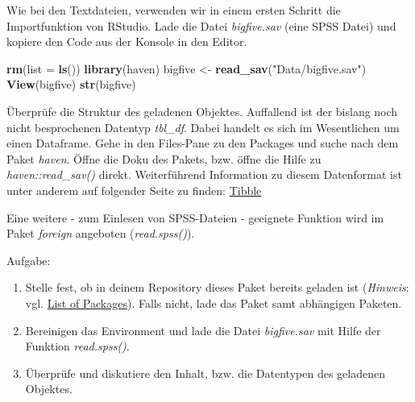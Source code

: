 \documentclass[]{article}
\newenvironment{Shaded}{\begin{snugshade}}{\end{snugshade}}
\newcommand{\KeywordTok}[1]{\textcolor[rgb]{0.13,0.29,0.53}{\textbf{#1}}}
\newcommand{\DataTypeTok}[1]{\textcolor[rgb]{0.13,0.29,0.53}{#1}}
\newcommand{\StringTok}[1]{\textcolor[rgb]{0.31,0.60,0.02}{#1}}
\newcommand{\NormalTok}[1]{#1}
\providecommand{\tightlist}{%
  \setlength{\itemsep}{0pt}\setlength{\parskip}{0pt}}
\begin{document}
Wie bei den Textdateien, verwenden wir in einem ersten Schritt die
Importfunktion von RStudio. Lade die Datei \emph{bigfive.sav} (eine SPSS
Datei) und kopiere den Code aus der Konsole in den Editor.

\begin{Shaded}
\begin{Highlighting}[]
  \KeywordTok{rm}\NormalTok{(}\DataTypeTok{list =} \KeywordTok{ls}\NormalTok{())}
  \KeywordTok{library}\NormalTok{(haven)}
\NormalTok{  bigfive <-}\StringTok{ }\KeywordTok{read_sav}\NormalTok{(}\StringTok{"Data/bigfive.sav"}\NormalTok{)}
  \KeywordTok{View}\NormalTok{(bigfive)}
  \KeywordTok{str}\NormalTok{(bigfive)}
\end{Highlighting}
\end{Shaded}

Überprüfe die Struktur des geladenen Objektes. Auffallend ist der
bislang noch nicht besprochenen Datentyp \emph{tbl\_df}. Dabei handelt
es sich im Wesentlichen um einen Dataframe. Gehe in den Files-Pane zu
den Packages und suche nach dem Paket \emph{haven}. Öffne die Doku des
Pakets, bzw. öffne die Hilfe zu \emph{haven::read\_sav()} direkt.
Weiterführend Information zu diesem Datenformat ist unter anderem auf
folgender Seite zu finden: \href{https://tibble.tidyverse.org/}{Tibble}

Eine weitere - zum Einlesen von SPSS-Dateien - geeignete Funktion wird
im Paket \emph{foreign} angeboten (\emph{read.spss()}).

Aufgabe:

\begin{enumerate}
\def\labelenumi{\arabic{enumi}.}
\tightlist
\item
  Stelle fest, ob in deinem Repository dieses Paket bereits geladen ist
  (\emph{Hinweis}: vgl.
  \href{https://www.r-bloggers.com/list-of-user-installed-r-packages-and-their-versions/}{List
  of Packages}). Falls nicht, lade das Paket samt abhängigen Paketen.
\item
  Bereinigen das Environment und lade die Datei \emph{bigfive.sav} mit
  Hilfe der Funktion \emph{read.spss()}.
\item
  Überprüfe und diskutiere den Inhalt, bzw. die Datentypen des geladenen
  Objektes.
\end{enumerate}
\end{document}
